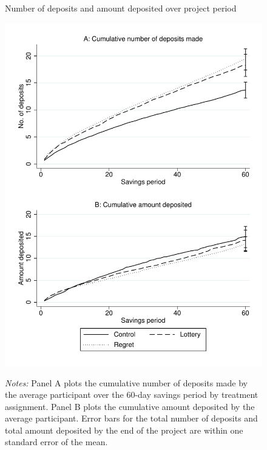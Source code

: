 \documentclass[12pt]{article}
\begin{document}
	\begin{figure}[h]
		\centering
		\caption{Number of deposits and amount deposited over project period}
		\includegraphics[height=0.85\textheight]{../../figures/line-cumdeposits.pdf}
		\label{fig:line-cumdeposits}
		\caption*{\footnotesize \emph{Notes:} Panel A plots the cumulative number of deposits made by the average participant over the 60-day savings period by treatment assignment. Panel B plots the cumulative amount deposited by the average participant. Error bars for the total number of deposits and total amount deposited by the end of the project are within one standard error of the mean.}
	\end{figure}
\end{document}
